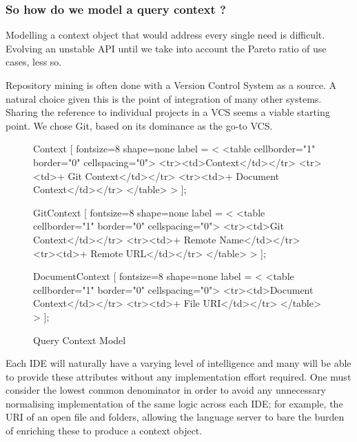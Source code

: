 \subsubsection{So how do we model a query context ?}

Modelling a context object that would address every single need is difficult. Evolving an unstable API until we take into account the Pareto ratio of use cases, less so. 

Repository mining is often done with a Version Control System as a source. A natural choice given this is the point of integration of many other systems. Sharing the reference to individual projects in a VCS seems a viable starting  point. We chose Git, based on its dominance as the go-to VCS.


\begin{figure}[h!]
{\centering
	 {	     
		     Context [
		     	fontsize=8
		     	shape=none
		     	label = <
		     		<table cellborder="1" border="0" cellspacing="0">
		     		<tr><td>Context</td></tr>
		     		<tr><td>+ Git Context</td></tr>
		     		<tr><td>+ Document Context</td></tr>	     		
		     		</table>
		     	>
		     ];
		     
		     GitContext [
		     fontsize=8
		     shape=none
		     label = <
			     <table cellborder="1" border="0" cellspacing="0">
			     <tr><td>Git Context</td></tr>
			     <tr><td>+ Remote Name</td></tr>
			     <tr><td>+ Remote URL</td></tr>	     		
			     </table>
		     >
		     ];
		     
		     DocumentContext [
		     fontsize=8
		     shape=none
		     label = <
			     <table cellborder="1" border="0" cellspacing="0">
			     <tr><td>Document Context</td></tr>
			     <tr><td>+ File URI</td></tr>  		
			     </table>
		     >
		     ];
			
	}
	\caption{Query Context Model}
}

\end{figure}

Each IDE will naturally have a varying level of intelligence and many will be able to provide these attributes without any implementation effort required. One must consider the lowest common denominator in order to avoid any unnecessary normalising implementation of the same logic across each IDE; for example, the URI of an open file and folders, allowing the language server to bare the burden of enriching these to produce a context object. 


